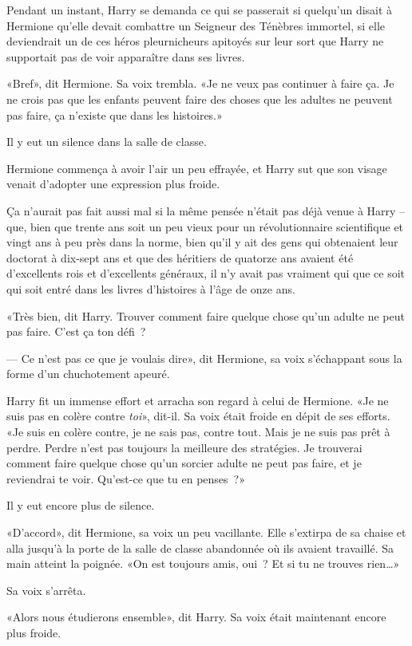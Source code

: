 Pendant un instant, Harry se demanda ce qui se passerait si quelqu'un disait à Hermione qu'elle devait combattre un Seigneur des Ténèbres immortel, si elle deviendrait un de ces héros pleurnicheurs apitoyés sur leur sort que Harry ne supportait pas de voir apparaître dans ses livres.

«Bref», dit Hermione. Sa voix trembla. «Je ne veux pas continuer à faire ça. Je ne crois pas que les enfants peuvent faire des choses que les adultes ne peuvent pas faire, ça n'existe que dans les histoires.»

Il y eut un silence dans la salle de classe.

Hermione commença à avoir l'air un peu effrayée, et Harry sut que son visage venait d'adopter une expression plus froide.

Ça n'aurait pas fait aussi mal si la même pensée n'était pas déjà venue à Harry -- que, bien que trente ans soit un peu vieux pour un révolutionnaire scientifique et vingt ans à peu près dans la norme, bien qu'il y ait des gens qui obtenaient leur doctorat à dix-sept ans et que des héritiers de quatorze ans avaient été d'excellents rois et d'excellents généraux, il n'y avait pas vraiment qui que ce soit qui soit entré dans les livres d'histoires à l'âge de onze ans.

«Très bien, dit Harry. Trouver comment faire quelque chose qu'un adulte ne peut pas faire. C'est ça ton défi~?

--- Ce n'est pas ce que je voulais dire», dit Hermione, sa voix s'échappant sous la forme d'un chuchotement apeuré.

Harry fit un immense effort et arracha son regard à celui de Hermione. «Je ne suis pas en colère contre \emph{toi}», dit-il. Sa voix était froide en dépit de ses efforts. «Je suis en colère contre, je ne sais pas, contre tout. Mais je ne suis pas prêt à perdre. Perdre n'est pas toujours la meilleure des stratégies. Je trouverai comment faire quelque chose qu'un sorcier adulte ne peut pas faire, et je reviendrai te voir. Qu'est-ce que tu en penses~?»

Il y eut encore plus de silence.

«D'accord», dit Hermione, sa voix un peu vacillante. Elle s'extirpa de sa chaise et alla jusqu'à la porte de la salle de classe abandonnée où ils avaient travaillé. Sa main atteint la poignée. «On est toujours amis, oui~? Et si tu ne trouves rien…»

Sa voix s'arrêta.

«Alors nous étudierons ensemble», dit Harry. Sa voix était maintenant encore plus froide.

